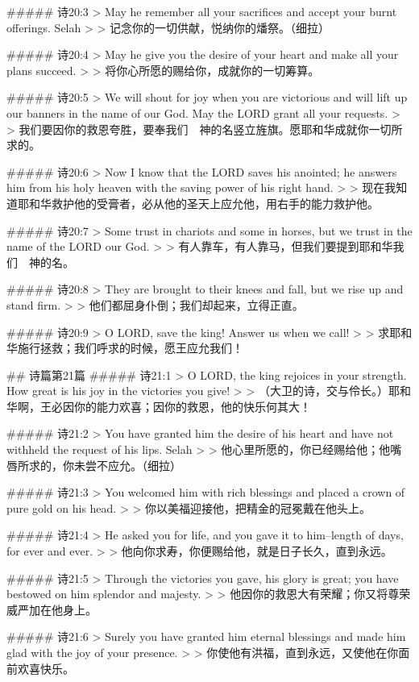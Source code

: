 ##### 诗20:3
> May he remember all your sacrifices and accept your burnt offerings. Selah
>
> 记念你的一切供献，悦纳你的燔祭。（细拉）


##### 诗20:4
> May he give you the desire of your heart and make all your plans succeed.
>
> 将你心所愿的赐给你，成就你的一切筹算。


##### 诗20:5
> We will shout for joy when you are victorious and will lift up our banners in the name of our God. May the LORD grant all your requests.
>
> 我们要因你的救恩夸胜，要奉我们　神的名竖立旌旗。愿耶和华成就你一切所求的。


##### 诗20:6
> Now I know that the LORD saves his anointed; he answers him from his holy heaven with the saving power of his right hand.
>
> 现在我知道耶和华救护他的受膏者，必从他的圣天上应允他，用右手的能力救护他。


##### 诗20:7
> Some trust in chariots and some in horses, but we trust in the name of the LORD our God.
>
> 有人靠车，有人靠马，但我们要提到耶和华我们　神的名。


##### 诗20:8
> They are brought to their knees and fall, but we rise up and stand firm.
>
> 他们都屈身仆倒；我们却起来，立得正直。


##### 诗20:9
> O LORD, save the king! Answer us when we call!
>
> 求耶和华施行拯救；我们呼求的时候，愿王应允我们！


## 诗篇第21篇
##### 诗21:1
> O LORD, the king rejoices in your strength. How great is his joy in the victories you give!
>
> （大卫的诗，交与伶长。）耶和华啊，王必因你的能力欢喜；因你的救恩，他的快乐何其大！


##### 诗21:2
> You have granted him the desire of his heart and have not withheld the request of his lips. Selah
>
> 他心里所愿的，你已经赐给他；他嘴唇所求的，你未尝不应允。（细拉）


##### 诗21:3
> You welcomed him with rich blessings and placed a crown of pure gold on his head.
>
> 你以美福迎接他，把精金的冠冕戴在他头上。


##### 诗21:4
> He asked you for life, and you gave it to him--length of days, for ever and ever.
>
> 他向你求寿，你便赐给他，就是日子长久，直到永远。


##### 诗21:5
> Through the victories you gave, his glory is great; you have bestowed on him splendor and majesty.
>
> 他因你的救恩大有荣耀；你又将尊荣威严加在他身上。


##### 诗21:6
> Surely you have granted him eternal blessings and made him glad with the joy of your presence.
>
> 你使他有洪福，直到永远，又使他在你面前欢喜快乐。


